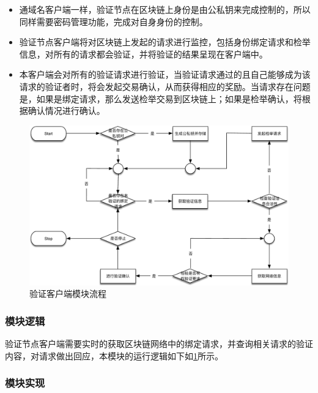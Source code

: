 \begin{itemize}
	\item 
	\noindent{}

	通域名客户端一样，验证节点在区块链上身份是由公私钥来完成控制的，所以同样需要密码管理功能，完成对自身身份的控制。

	\item 
	\noindent{}
	验证节点客户端将对区块链上发起的请求进行监控，包括身份绑定请求和检举信息，对所有的请求都会验证，并将验证的结果呈现在客户端中。

	\item
	\noindent{}

	本客户端会对所有的验证请求进行验证，当验证请求通过的且自己能够成为该请求的验证者时，将会发起交易确认，从而获得相应的奖励。当请求存在问题是，如果是绑定请求，那么发送检举交易到区块链上；如果是检举确认，将根据确认情况进行确认。
	

\end{itemize}

\begin{figure}[!htbp]
 	\centering
 	\includegraphics[scale=0.6]{img/validator_work_flow}
 	\caption{验证客户端模块流程}\label{fig:validator_work_flow}
\end{figure}

\subsubsection{模块逻辑}

验证节点客户端需要实时的获取区块链网络中的绑定请求，并查询相关请求的验证内容，对请求做出回应，本模块的运行逻辑如下如\ref{fig:validator_work_flow}所示。

\subsubsection{模块实现}

